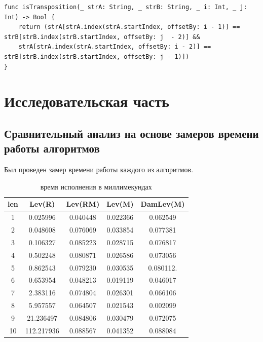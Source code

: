 \documentclass[12pt]{report}
\begin{document}
\begin{lstlisting}[label=some-code,caption=Функция проверки транпозиции]
func isTransposition(_ strA: String, _ strB: String, _ i: Int, _ j: Int) -> Bool {
	return (strA[strA.index(strA.startIndex, offsetBy: i - 1)] == strB[strB.index(strB.startIndex, offsetBy: j  - 2)] &&
	strA[strA.index(strA.startIndex, offsetBy: i - 2)] == strB[strB.index(strB.startIndex, offsetBy: j - 1)])
}
\end{lstlisting}

\chapter{Исследовательская часть}

\section{Сравнительный анализ на основе замеров времени работы алгоритмов}

Был проведен замер времени работы каждого из алгоритмов.
\begin{table}
	\centering
	\caption{время исполнения в миллимекундах}
	\begin{tabular}{|c c c c c|} 
 	\hline
	len & Lev(R) & Lev(RM) & Lev(M) & DamLev(M) \\ [0.5ex] 
 	\hline\hline
  	1 & 0.025996 & 0.040448 & 0.022366 & 0.062549\\
 	\hline
 	2 & 0.048608 & 0.076069 & 0.033854 & 0.077381\\
 	\hline
	3 & 0.106327 & 0.085223 & 0.028715 & 0.076817\\
	\hline
	4 & 0.502248 & 0.080871 & 0.026586 & 0.073056\\
	\hline
	5 & 0.862543 & 0.079230 & 0.030535 & 0.080112.\\
	\hline
	6 & 0.653954 & 0.048213 & 0.019119 & 0.046017\\
	\hline
	7 & 2.383116 & 0.074804 & 0.026301 & 0.066106\\
	\hline
	8 & 5.957557 & 0.064507 & 0.021543 & 0.002099\\
	\hline
	9 & 21.236497 & 0.084806 & 0.030479 & 0.072075\\
	\hline
	10 & 112.217936 & 0.088567 & 0.041352 & 0.088084\\
	\hline
	\end{tabular}
\end{table}
\end{document}
